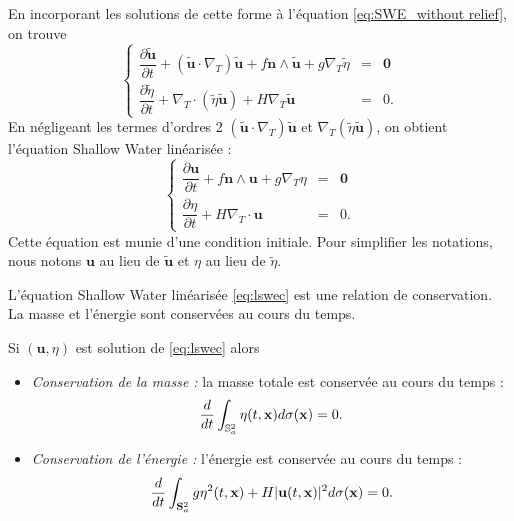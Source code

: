 En incorporant les solutions de cette forme à l'équation \eqref{eq:SWE_without relief}, on trouve
\begin{equation}
\left\lbrace
\begin{array}{rcl}
\dfrac{\partial \tilde{\mathbf{u}}}{\partial t} + \left( \tilde{\mathbf{u}} \cdot \nabla_T \right) \tilde{\mathbf{u}} + f \mathbf{n} \wedge \tilde{\mathbf{u}} + g \nabla_T \tilde{\eta} & = & \mathbf{0} \\
\dfrac{\partial \tilde{\eta}}{\partial t} + \nabla_T \cdot \left( \tilde{\eta} \tilde{\mathbf{u}} \right) + H \nabla_T \tilde{\mathbf{u}} & = & 0.
\end{array}
\right.
\end{equation}
En négligeant les termes d'ordres 2 $(\tilde{\mathbf{u}} \cdot \nabla_T ) \tilde{\mathbf{u}}$ et $\nabla_T (\tilde{\eta} \tilde{\mathbf{u}})$, on obtient l'équation Shallow Water linéarisée :
\begin{equation}
\left\lbrace
\begin{array}{rcl}
\dfrac{\partial \mathbf{u}}{\partial t} + f \mathbf{n} \wedge \mathbf{u} + g \nabla_T \eta & = & \mathbf{0} \\
\dfrac{\partial \eta}{\partial t} +  H \nabla_T \cdot \mathbf{u} & = & 0.
\end{array}
\right.
\label{eq:lswec}
\end{equation}
Cette équation est munie d'une condition initiale.
Pour simplifier les notations, nous notons $\mathbf{u}$ au lieu de $\tilde{\mathbf{u}}$ et $\eta$ au lieu de $\tilde{\eta}$.

L'équation Shallow Water linéarisée \eqref{eq:lswec} est une relation de conservation. La masse et l'énergie sont conservées au cours du temps.

\begin{proposition}
Si $(\mathbf{u}, \eta)$ est solution de \eqref{eq:lswec} alors
\begin{itemize}
\item \textit{Conservation de la masse : } la masse totale est conservée au cours du temps :
\begin{equation}
\dfrac{d}{dt} \displaystyle\int_{\mathbb{S}_a^2} \eta(t,\mathbf{x})d\sigma(\mathbf{x}) = 0.
\end{equation}

\item \textit{Conservation de l'énergie : }
l'énergie est conservée au cours du temps :
\begin{equation}
\dfrac{d}{dt} \displaystyle\int_{\mathbf{S}_a^2 }g  \eta^2(t,\mathbf{x}) + H | \mathbf{u}(t,\mathbf{x}) |^2 d \sigma (\mathbf{x}) = 0.
\end{equation}
\label{prop:lswe_cons}
\end{itemize}
\end{proposition}


